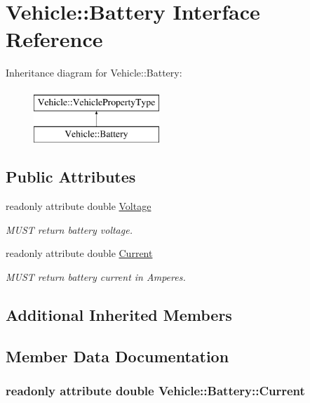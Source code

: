 \hypertarget{interfaceVehicle_1_1Battery}{\section{Vehicle\-:\-:Battery Interface Reference}
\label{interfaceVehicle_1_1Battery}
}
Inheritance diagram for Vehicle\-:\-:Battery\-:\begin{figure}[H]
\begin{center}
\leavevmode
\includegraphics[height=2.000000cm]{interfaceVehicle_1_1Battery}
\end{center}
\end{figure}
\subsection*{Public Attributes}
\begin{DoxyCompactItemize}
\item 
readonly attribute double \hyperlink{interfaceVehicle_1_1Battery_a1c01ff53b9c0f33e88e54e66ce139be8}{Voltage}
\begin{DoxyCompactList}\small\item\em M\-U\-S\-T return battery voltage. \end{DoxyCompactList}\item 
readonly attribute double \hyperlink{interfaceVehicle_1_1Battery_a6a2b4d5ed3897ad2046d46f0d15f6d0f}{Current}
\begin{DoxyCompactList}\small\item\em M\-U\-S\-T return battery current in Amperes. \end{DoxyCompactList}\end{DoxyCompactItemize}
\subsection*{Additional Inherited Members}


\subsection{Member Data Documentation}
\hypertarget{interfaceVehicle_1_1Battery_a6a2b4d5ed3897ad2046d46f0d15f6d0f}{
\subsubsection[{Current}]{\setlength{\rightskip}{0pt plus 5cm}readonly attribute double Vehicle\-::\-Battery\-::\-Current}}\label{interfaceVehicle_1_1Battery_a6a2b4d5ed3897ad2046d46f0d15f6d0f}


